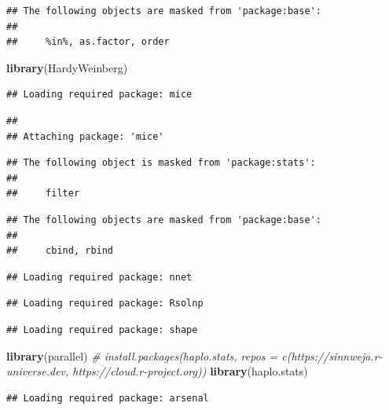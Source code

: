 \documentclass[
]{article}
\newenvironment{Shaded}{\begin{snugshade}}{\end{snugshade}}
\newcommand{\CommentTok}[1]{\textcolor[rgb]{0.56,0.35,0.01}{\textit{#1}}}
\newcommand{\FunctionTok}[1]{\textcolor[rgb]{0.13,0.29,0.53}{\textbf{#1}}}
\newcommand{\NormalTok}[1]{#1}
\begin{document}
\begin{verbatim}
## The following objects are masked from 'package:base':
## 
##     %in%, as.factor, order
\end{verbatim}

\begin{Shaded}
\begin{Highlighting}[]
\FunctionTok{library}\NormalTok{(HardyWeinberg)}
\end{Highlighting}
\end{Shaded}

\begin{verbatim}
## Loading required package: mice
\end{verbatim}

\begin{verbatim}
## 
## Attaching package: 'mice'
\end{verbatim}

\begin{verbatim}
## The following object is masked from 'package:stats':
## 
##     filter
\end{verbatim}

\begin{verbatim}
## The following objects are masked from 'package:base':
## 
##     cbind, rbind
\end{verbatim}

\begin{verbatim}
## Loading required package: nnet
\end{verbatim}

\begin{verbatim}
## Loading required package: Rsolnp
\end{verbatim}

\begin{verbatim}
## Loading required package: shape
\end{verbatim}

\begin{Shaded}
\begin{Highlighting}[]
\FunctionTok{library}\NormalTok{(parallel)}
\CommentTok{\# install.packages(\textquotesingle{}haplo.stats\textquotesingle{}, repos = c(\textquotesingle{}https://sinnweja.r{-}universe.dev\textquotesingle{}, \textquotesingle{}https://cloud.r{-}project.org\textquotesingle{}))}
\FunctionTok{library}\NormalTok{(haplo.stats)}
\end{Highlighting}
\end{Shaded}

\begin{verbatim}
## Loading required package: arsenal
\end{verbatim}
\end{document}
